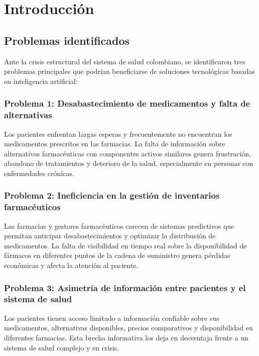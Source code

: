 \section{Introducción}

\subsection{Problemas identificados}

Ante la crisis estructural del sistema de salud colombiano, se identificaron tres problemas principales que podrían beneficiarse de soluciones tecnológicas basadas en inteligencia artificial:

\subsubsection{Problema 1: Desabastecimiento de medicamentos y falta de alternativas}

Los pacientes enfrentan largas esperas y frecuentemente no encuentran los medicamentos prescritos en las farmacias. La falta de información sobre alternativas farmacéuticas con componentes activos similares genera frustración, abandono de tratamientos y deterioro de la salud, especialmente en personas con enfermedades crónicas.

\subsubsection{Problema 2: Ineficiencia en la gestión de inventarios farmacéuticos}

Las farmacias y gestores farmacéuticos carecen de sistemas predictivos que permitan anticipar desabastecimientos y optimizar la distribución de medicamentos. La falta de visibilidad en tiempo real sobre la disponibilidad de fármacos en diferentes puntos de la cadena de suministro genera pérdidas económicas y afecta la atención al paciente.

\subsubsection{Problema 3: Asimetría de información entre pacientes y el sistema de salud}

Los pacientes tienen acceso limitado a información confiable sobre sus medicamentos, alternativas disponibles, precios comparativos y disponibilidad en diferentes farmacias. Esta brecha informativa los deja en desventaja frente a un sistema de salud complejo y en crisis.


